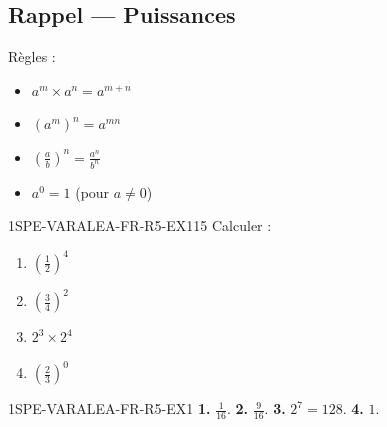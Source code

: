 
\subsection*{Rappel — Puissances}

Règles :
\begin{itemize}
  \item $a^m \times a^n = a^{m+n}$
  \item $(a^m)^n = a^{mn}$
  \item $\left(\frac{a}{b}\right)^n = \frac{a^n}{b^n}$
  \item $a^0 = 1$ (pour $a
\neq 0$)
\end{itemize}

\begin{exercice}{1SPE-VARALEA-FR-R5-EX1}{1}{5}
Calculer :
\begin{enumerate}
  \item $\left(\frac{1}{2}\right)^4$
  \item $\left(\frac{3}{4}\right)^2$
  \item $2^3 \times 2^4$
  \item $\left(\frac{2}{3}\right)^0$
\end{enumerate}
\end{exercice}


\begin{corrige}{1SPE-VARALEA-FR-R5-EX1}
\textbf{1.} $\frac{1}{16}$.
\textbf{2.} $\frac{9}{16}$.
\textbf{3.} $2^7 = 128$.
\textbf{4.} $1$.
\end{corrige}
